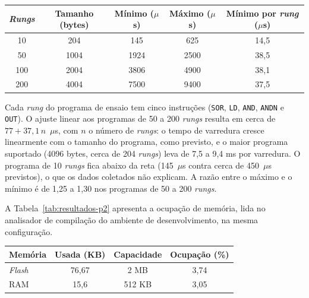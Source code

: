 \begin{tabelafixa}
    \centering
    \label{tab:resultados-p1}
    \begin{tabular}{ccccc}
        \hline
        \textit{Rungs} & Tamanho (bytes) & Mínimo ($\mu$s) & Máximo ($\mu$s) & Mínimo por \textit{rung} ($\mu$s) \\
        \hline
        10 & 204 & 145 & 625 & 14,5 \\
        50 & 1004 & 1924 & 2500 & 38,5 \\
        100 & 2004 & 3806 & 4900 & 38,1 \\
        200 & 4004 & 7500 & 9400 & 37,5 \\
        \hline
    \end{tabular}
    \vspace{14pt}
\end{tabelafixa}

Cada \textit{rung} do programa de ensaio tem cinco instruções (\texttt{SOR}, \texttt{LD}, \texttt{AND}, \texttt{ANDN} e \texttt{OUT}).
O ajuste linear aos programas de 50 a 200 \textit{rungs} resulta em cerca de $77 + 37{,}1\,n$~$\mu$s, com $n$ o número de \textit{rungs}: o tempo de varredura cresce linearmente com o tamanho do programa, como previsto, e o maior programa suportado (4096 bytes, cerca de 204 \textit{rungs}) leva de 7,5 a 9,4 ms por varredura.
O programa de 10 \textit{rungs} fica abaixo da reta (145~$\mu$s contra cerca de 450~$\mu$s previstos), o que os dados coletados não explicam.
A razão entre o máximo e o mínimo é de 1,25 a 1,30 nos programas de 50 a 200 \textit{rungs}.

A Tabela~\ref{tab:resultados-p2} apresenta a ocupação de memória, lida no analisador de compilação do ambiente de desenvolvimento, na mesma configuração.

\begin{tabelafixa}
    \centering
    \label{tab:resultados-p2}
    \begin{tabular}{lccc}
        \hline
        Memória & Usada (KB) & Capacidade & Ocupação (\%) \\
        \hline
        \textit{Flash} & 76,67 & 2 MB & 3,74 \\
        RAM & 15,6 & 512 KB & 3,05 \\
        \hline
    \end{tabular}
    \vspace{14pt}
\end{tabelafixa}

